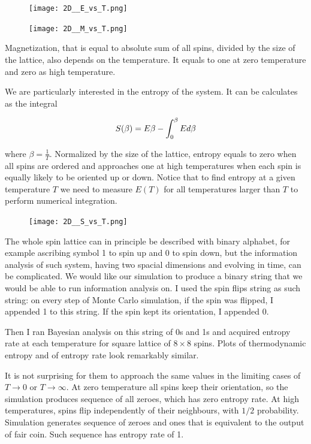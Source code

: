 \documentclass{llncs}
\begin{document}
\begin{figure}[h!]
\texttt{[image: 2D\_\_E\_vs\_T.png]}
\centering
\end{figure}

\begin{figure}[H]
\texttt{[image: 2D\_\_M\_vs\_T.png]}
\centering
\end{figure}

Magnetization, that is equal to absolute sum of all spins, divided by the size of the lattice, also depends on the temperature. It equals to one at zero temperature and zero as high temperature.


We are particularly interested in the entropy of the system. It can be calculates as the integral

\begin{equation}
S(\beta) = E \beta - \int_0^{\beta} E d\beta\\
\end{equation}

where $\beta = \frac{1}{T}$. Normalized by the size of the lattice, entropy equals to zero when all spins are ordered and approaches one at high temperatures when each spin is equally likely to be oriented up or down. Notice that to find entropy at a given temperature $T$ we need to measure $E(T)$ for all temperatures larger than $T$ to perform numerical integration.

\begin{figure}[h]
\texttt{[image: 2D\_\_S\_vs\_T.png]}
\centering
\end{figure}

The whole spin lattice can in principle be described with binary alphabet, for example ascribing symbol 1 to spin up and 0 to spin down, but the information analysis of such system, having two spacial dimensions and evolving in time, can be complicated.
We would like our simulation to produce a binary string that we would be able to run information analysis on.
I used the spin flips string as such string: on every step of Monte Carlo simulation, if the spin was flipped, I appended 1 to this string. If the spin kept its orientation, I appended 0.

Then I ran Bayesian analysis on this string of 0s and 1s and acquired entropy rate at each temperature for square lattice of $8 \times 8$ spins. Plots of thermodynamic entropy and of entropy rate look remarkably similar.

It is not surprising for them to approach the same values in the limiting cases of $T \to 0$ or $T \to \infty$. At zero temperature all spins keep their orientation, so the simulation produces sequence of all zeroes, which has zero entropy rate.
At high temperatures, spins flip independently of their neighbours, with $1/2$ probability. Simulation generates sequence of zeroes and ones that is equivalent to the output of fair coin. Such sequence has entropy rate of 1.
\end{document}
